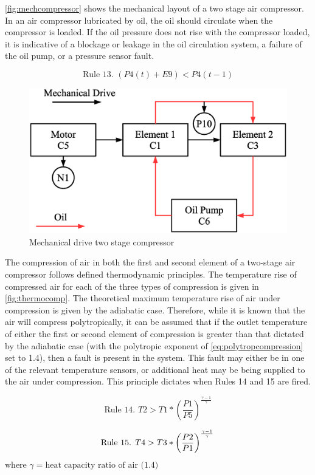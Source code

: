\autoref{fig:mechcompressor} shows the mechanical layout of a two stage air compressor. In an air compressor lubricated by oil, the oil should circulate when the compressor is loaded. If the oil pressure does not rise with the compressor loaded, it is indicative of a blockage or leakage in the oil circulation system, a failure of the oil pump, or a pressure sensor fault.

\begin{equation}
\text{Rule 13. }(P4(t) + E9) < P4(t-1)
\label{eq:rule13}
\end{equation}

\begin{figure}
\includegraphics[width = .6\columnwidth]{./Images/MechanicalCompressor.eps}
\caption{Mechanical drive two stage compressor}
\label{fig:mechcompressor}
\end{figure}

The compression of air in both the first and second element of a two-stage air compressor follows defined thermodynamic principles. The temperature rise of compressed air for each of the three types of compression is given in \autoref{fig:thermocomp}. The theoretical maximum temperature rise of air under compression is given by the adiabatic case. Therefore, while it is known that the air will compress polytropically, it can be assumed that if the outlet temperature of either the first or second element of compression is greater than that dictated by the adiabatic case (with the polytropic exponent of \autoref{eq:polytropcompression} set to 1.4), then a fault is present in the system. This fault may either be in one of the relevant temperature sensors, or additional heat may be being supplied to the air under compression. This principle dictates when Rules 14 and 15 are fired.

\begin{equation}
\text{Rule 14. } T2 > T1 * \left(\frac{P1}{P5}\right)^\frac{\gamma-1}{\gamma}
\label{eq:rule14}
\end{equation}

\begin{equation}
\text{Rule 15. } T4 > T3 * \left(\frac{P2}{P1}\right)^\frac{\gamma-1}{\gamma} \\
\label{eq:rule15}
\end{equation}
$\text{where } \gamma = \text{heat capacity ratio of air (1.4)}$


